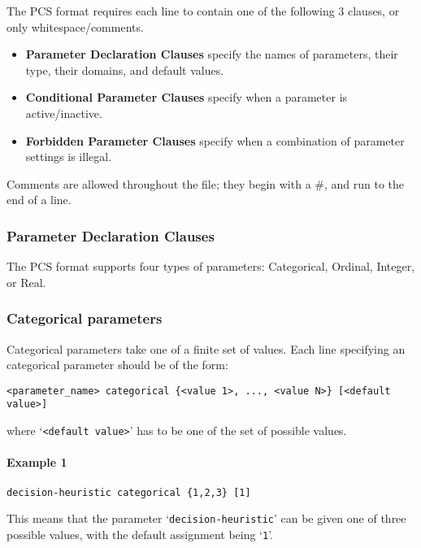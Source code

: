 \documentclass[manual.tex]{subfiles}
\begin{document}
The PCS format requires each line to contain one of the following 3 clauses, or only whitespace/comments.
\begin{itemize}
\item \textbf{Parameter Declaration Clauses} specify the names of parameters, their type, their domains, and default values.
\item \textbf{Conditional Parameter Clauses} specify when a parameter is active/inactive.
\item \textbf{Forbidden Parameter Clauses} specify when a combination of parameter settings is illegal.
\end{itemize}
Comments are allowed throughout the file; they begin with a \#, and run to the end of a line. 

\subsubsection{Parameter Declaration Clauses}\label{sec:param_decl_clauses}

The PCS format supports four types of parameters: Categorical, Ordinal, Integer, or Real.

\subsubsection*{Categorical parameters} \label{sec:categorical-params}
Categorical parameters take one of a finite set of values. Each line specifying an categorical parameter should be of the form:

\begin{verbatim}
<parameter_name> categorical {<value 1>, ..., <value N>} [<default value>]
\end{verbatim}
where `\texttt{<default value>}' has to be one of the set of possible values. 

\paragraph{Example 1}
\begin{verbatim}
decision-heuristic categorical {1,2,3} [1]
\end{verbatim}
This means that the parameter `\texttt{decision-heuristic}' can be given one of three possible values, with the default assignment being `\texttt{1}'.
\end{document}
